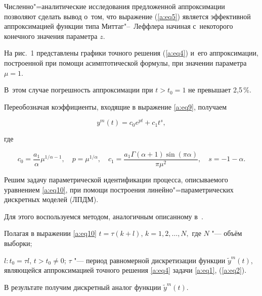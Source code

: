 Численно"=аналитические исследования предложенной аппроксимации позволяют сделать вывод о~том, что выражение (\ref{a:eq5}) является эффективной аппроксимацией функции типа Миттаг"--~Леффлера начиная с~некоторого конечного значения параметра $z$. 

На рис.~1 представлены графики точного решения (\ref{a:eq4}) и~его аппроксимации, построенной при помощи асимптотической формулы, при значении параметра $\mu=1$. 

В~этом случае погрешность аппроксимации при $t>t_0=1$ не превышает 2,5\,\%.







Переобозначая коэффициенты, входящие в выражение \eqref{a:eq9}, получаем

\begin{equation}

\label{a:eq10}

y^m(t)=c_0 e^{p t}+ c_1 t^s, 

\end{equation}

где 

\begin{equation}

\label{a:eq11}

c_0=\frac{a_1}{\alpha}\mu ^{{1}/{\alpha}-1}, \quad 	

p=\mu^{{1}/{\alpha}},	\quad 

c_1=\frac{a_1\Gamma(\alpha+1) \sin(\pi \alpha)}{\pi \mu^2} ,	 \quad 

s=-1-\alpha.

\end{equation}



Решим задачу параметрической идентификации процесса, описываемого уравнением \eqref{a:eq10}, при помощи построения линейно"=параметрических дискретных моделей (ЛПДМ). 

Для  этого воспользуемся методом, аналогичным описанному в~\cite{a:A}.

Полагая в выражении \eqref{a:eq10} $t=\tau (k+l)$, $k=1, 2, \dots, N, $ где $N$ "--- объём выборки; 

$ l: t_0=\tau l$, $t>t_0 \neq 0$; $\tau $ "--- период равномерной дискретизации функции $\tilde{y}^m(t)$, являющейся аппроксимацией точного решения \eqref{a:eq4} задачи \eqref{a:eq1}, (\ref{a:eq2}). 

В результате получим дискретный аналог функции $\tilde{y}^m(t) $. 

